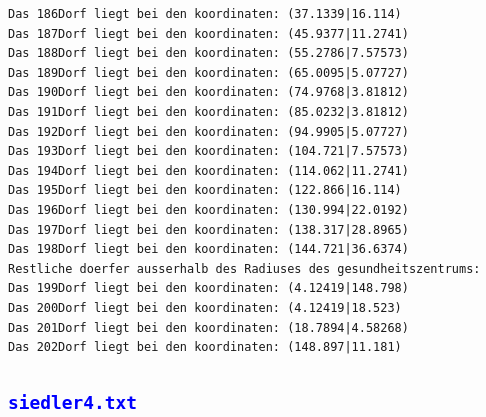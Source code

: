 \documentclass{article}
\begin{document}
\begin{verbatim}
Das 186Dorf liegt bei den koordinaten: (37.1339|16.114)
Das 187Dorf liegt bei den koordinaten: (45.9377|11.2741)
Das 188Dorf liegt bei den koordinaten: (55.2786|7.57573)
Das 189Dorf liegt bei den koordinaten: (65.0095|5.07727)
Das 190Dorf liegt bei den koordinaten: (74.9768|3.81812)
Das 191Dorf liegt bei den koordinaten: (85.0232|3.81812)
Das 192Dorf liegt bei den koordinaten: (94.9905|5.07727)
Das 193Dorf liegt bei den koordinaten: (104.721|7.57573)
Das 194Dorf liegt bei den koordinaten: (114.062|11.2741)
Das 195Dorf liegt bei den koordinaten: (122.866|16.114)
Das 196Dorf liegt bei den koordinaten: (130.994|22.0192)
Das 197Dorf liegt bei den koordinaten: (138.317|28.8965)
Das 198Dorf liegt bei den koordinaten: (144.721|36.6374)
Restliche doerfer ausserhalb des Radiuses des gesundheitszentrums: 
Das 199Dorf liegt bei den koordinaten: (4.12419|148.798)
Das 200Dorf liegt bei den koordinaten: (4.12419|18.523)
Das 201Dorf liegt bei den koordinaten: (18.7894|4.58268)
Das 202Dorf liegt bei den koordinaten: (148.897|11.181)

\end{verbatim}
\subsection{\textcolor{blue}{\texttt{siedler4.txt}}}
\end{document}
